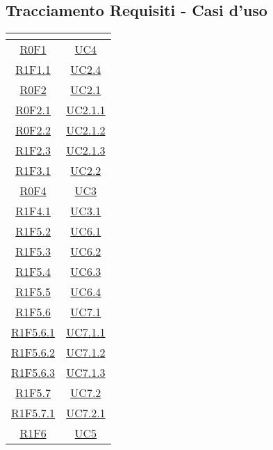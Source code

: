 \subsection{Tracciamento Requisiti - Casi d'uso}
\vspace{1cm}
\normalsize
\renewcommand{\arraystretch}{1.5}
\begin{longtable}{|c|c|}
	\hline
	\rowcolor{title_row}
\textbf{\color{title_text}{Codice Requisiti}} & \textbf{\color{title_text}{Codice Casi d'uso}} \\
\hline
\endhead
\hyperlink{R0F1}{R0F1} & \hyperlink{UC4}{UC4}\\
\hline
\hyperlink{R1F1.1}{R1F1.1} & \hyperlink{UC2.4}{UC2.4}\\
\hline
\hyperlink{R0F2}{R0F2} & \hyperlink{UC2.1}{UC2.1}\\
\hline
\hyperlink{R0F2.1}{R0F2.1} & \hyperlink{UC2.1.1}{UC2.1.1}\\
\hline
\hyperlink{R0F2.2}{R0F2.2} & \hyperlink{UC2.1.2}{UC2.1.2}\\
\hline
\hyperlink{R1F2.3}{R1F2.3} & \hyperlink{UC2.1.3}{UC2.1.3}\\
\hline
\hyperlink{R1F3.1}{R1F3.1} & \hyperlink{UC2.2}{UC2.2}\\
\hline
\hyperlink{R0F4}{R0F4} & \hyperlink{UC3}{UC3}\\
\hline
\hyperlink{R1F4.1}{R1F4.1} & \hyperlink{UC3.1}{UC3.1}\\
\hline
\hyperlink{R1F5.2}{R1F5.2} & \hyperlink{UC6.1}{UC6.1}\\
\hline
\hyperlink{R1F5.3}{R1F5.3} & \hyperlink{UC6.2}{UC6.2}\\
\hline
\hyperlink{R1F5.4}{R1F5.4} & \hyperlink{UC6.3}{UC6.3}\\
\hline
\hyperlink{R1F5.5}{R1F5.5} & \hyperlink{UC6.4}{UC6.4}\\
\hline
\hyperlink{R1F5.6}{R1F5.6} & \hyperlink{UC7.1}{UC7.1}\\
\hline
\hyperlink{R1F5.6.1}{R1F5.6.1} & \hyperlink{UC7.1.1}{UC7.1.1}\\
\hline
\hyperlink{R1F5.6.2}{R1F5.6.2} & \hyperlink{UC7.1.2}{UC7.1.2}\\
\hline
\hyperlink{R1F5.6.3}{R1F5.6.3} & \hyperlink{UC7.1.3}{UC7.1.3}\\
\hline
\hyperlink{R1F5.7}{R1F5.7} & \hyperlink{UC7.2}{UC7.2}\\
\hline
\hyperlink{R1F5.7.1}{R1F5.7.1} & \hyperlink{UC7.2.1}{UC7.2.1}\\
\hline
\hyperlink{R1F6}{R1F6} & \hyperlink{UC5}{UC5}\\

\end{longtable}
